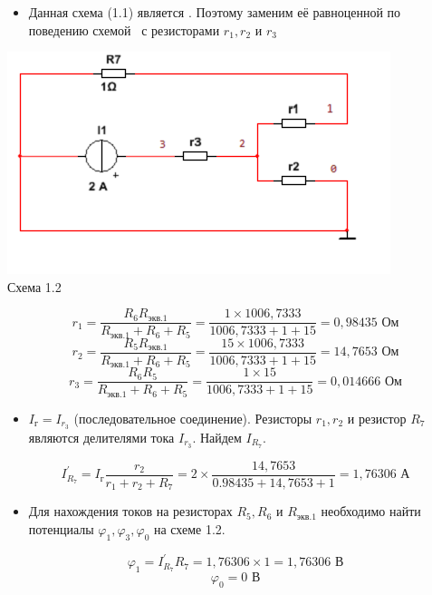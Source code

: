 \documentclass[12pt, a4paper]{report}
\begin{document}
    \newpage

    \begin{itemize}
        \item Данная схема (1.1) является \guillemotright. Поэтому заменим её равноценной по поведению схемой \guillemotright\, с резисторами $r_1, r_2 \text{ и } r_3$
    \end{itemize}
    \begin{center}
        \includegraphics[scale = 1.3]{photo4.png}\\
        Схема 1.2
    \end{center}\bigskip\bigskip
    \[ r_1 = \frac{R_{6}R_{\text{экв.1}}}{R_{\text{экв.1}} + R_6 + R_5} = \frac{1 \times 1006,7333}{1006,7333 + 1 + 15} = 0,98435 \text{ Ом} \]
    \[ r_2 = \frac{R_{5}R_{\text{экв.1}}}{R_{\text{экв.1}} + R_6 + R_5} = \frac{15 \times 1006,7333}{1006,7333 + 1 + 15} = 14,7653 \text{ Ом} \]
    \[ r_3 = \frac{R_{6}R_5}{R_{\text{экв.1}} + R_6 + R_5} = \frac{1 \times 15}{1006,7333 + 1 + 15} = 0,014666 \text{ Ом} \]
    \begin{itemize}
        \item $I_{\text{г}} = I_{r_3}$ (последовательное соединение). Резисторы $r_1, r_2$ и резистор $R_7$ являются делителями тока $I_{r_3}$. Найдем $I_{R_7}$.
    \end{itemize}
    \[ I_{R_7}^\prime = I_{\text{г}}\frac{r_2}{r_1 + r_2 + R_7} = 2 \times \frac{14,7653}{0.98435 + 14,7653 + 1} = 1,76306 \text{ А} \]
    \begin{itemize}
        \item Для нахождения токов на резисторах $R_5, R_6$ и $R_{\text{экв.1}}$ необходимо найти потенциалы $\varphi_1, \varphi_3, \varphi_0$ на схеме 1.2.
    \end{itemize}
    \[ \varphi_1 = I_{R_7}^\prime R_7 = 1,76306 \times 1 = 1,76306 \text{ В} \]
    \[ \varphi_0 = 0 \text{ В} \]
\end{document}
